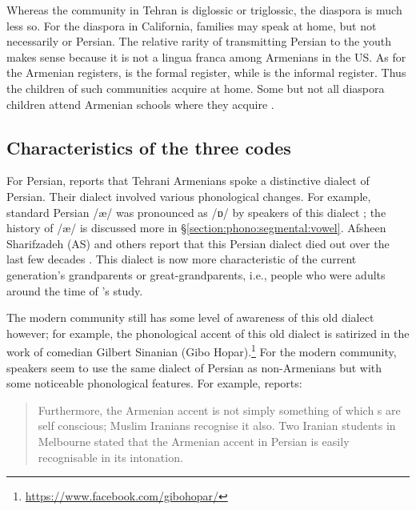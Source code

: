 Whereas the {\iaIA} community in Tehran is diglossic or triglossic, the {\iaIA} diaspora is much less so. For the diaspora  in California,   families may speak {\iaIA} at home, but not necessarily {\seaSE} or Persian. The relative rarity of transmitting Persian to the youth makes sense because it is not a lingua franca among Armenians in the US. As for the Armenian registers,  {\seaSEA} is the formal register, while {\iaIA} is the informal register. Thus the children of such communities acquire {\iaIA} at home. Some but not all diaspora children attend Armenian schools where they    acquire {\seaSE}. 

\subsection{Characteristics  of the three codes}\label{section: intro: socio: characteristics}

For Persian,  \citet[\S6.7]{zamir-1982-variationStandardPersianSociolinguisticStudy} reports that Tehrani Armenians spoke a distinctive   dialect of Persian. Their dialect involved various phonological changes. For example, standard Persian /æ/ was pronounced as /ɒ/ by speakers of this dialect \citep[370]{zamir-1982-variationStandardPersianSociolinguisticStudy}; the history of /æ/ is discussed more in \S\ref{section:phono:segmental:vowel}.  Afsheen Sharifzadeh  (AS) and others report  that this Persian dialect     died out over the last few decades \citep[154]{Barry-2017-Monologue}. This dialect  is now more characteristic of the current generation's grandparents or great-grandparents, i.e., people who were adults around the time of \citet{zamir-1982-variationStandardPersianSociolinguisticStudy}'s study. 

The modern community still has some level of awareness of this old  dialect however; for example, the phonological accent of this old dialect is   satirized in the work of {\iaIA} comedian  Gilbert Sinanian (Gibo Hopar).\footnote{\url{https://www.facebook.com/gibohopar/}} For the modern community, speakers seem to use the same dialect of Persian as non-Armenians but with some noticeable phonological features. For example, \citet[220]{barry-2018-armenianArmeniansIran} reports: 

\begin{quote}
	Furthermore, the Armenian accent is not simply something of which {\iaIA}s are self conscious; Muslim Iranians recognise it also. Two Iranian students in Melbourne stated that the Armenian accent in Persian is easily recognisable in its intonation.
\end{quote}

